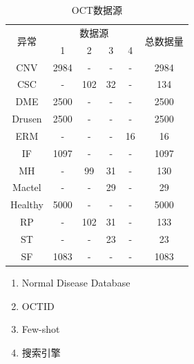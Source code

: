 \documentclass{article}
\begin{document}
		
		\vspace{-0.5cm}
		\begin{minipage}[t]{0.4\linewidth}
			{
				\fontsize{9}{12}\selectfont
				{
					\begin{longtable}{cccccc}
						\caption{OCT数据源}
						\label{tb:OCT_source}\\
						\toprule
						\multirow{2}{*}{异常}&\multicolumn{4}{c}{数据源}&\multirow{2}{*}{总数据量}\\
						&1&2&3&4&\\
						\midrule
						CNV    &2984&-  &- &- &2984\\
						CSC    &-   &102&32&- &134 \\
						DME    &2500&-  &- &- &2500\\
						Drusen &2500&-  &- &- &2500\\
						ERM    &-   &-  &- &16&16  \\
						IF     &1097&-  &- &- &1097\\
						MH     &-   &99 &31&- &130 \\
						Mactel &-   &-  &29&- &29  \\
						Healthy&5000&-  &- &- &5000\\
						RP     &-   &102&31&- &133 \\
						ST     &-   &-  &23&- &23  \\
						SF     &1083&-  &- &- &1083\\
						\bottomrule
					\end{longtable}
					
					\vspace{0.5cm}
					\begin{enumerate}
						\item Normal Disease Database \autocite{Kermany_database}
						\vspace{-0.2cm}
						
						\item OCTID \autocite{Gholami_Roy_Parthasarathy_Lakshminarayanan_2020}
						\vspace{-0.2cm}
						
						\item Few-shot \autocite{Yoo_2020}
						\vspace{-0.2cm}
						
						\item 搜索引擎
						\vspace{-0.2cm}
					\end{enumerate}
					
					\vspace{0.5cm}
				}
			}
		\end{minipage}
\end{document}
